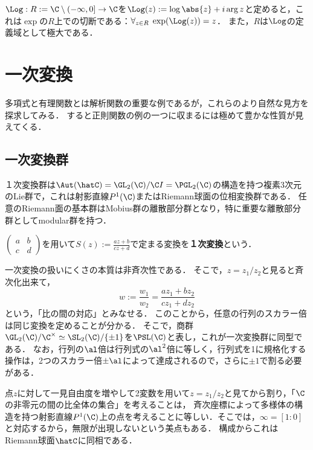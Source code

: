 \documentclass[uplatex, dvipdfmx]{jsreport}
\begin{document}
\begin{theorem}
    $\Log:R:=\C\setminus(-\infty,0]\to\C$を$\Log(z):=\log\abs{z}+i\arg z$と定めると，これは$\exp$の$R$上での切断である：$\forall_{z\in R}\;\exp(\Log(z))=z$．
    また，$R$は$\Log$の定義域として極大である．
\end{theorem}

\section{一次変換}

\begin{tcolorbox}[colframe=ForestGreen, colback=ForestGreen!10!white,breakable,colbacktitle=ForestGreen!40!white,coltitle=black,fonttitle=\bfseries\sffamily,
title=]
    多項式と有理関数とは解析関数の重要な例であるが，これらのより自然な見方を探求してみる．
    すると正則関数の例の一つに収まるには極めて豊かな性質が見えてくる．
\end{tcolorbox}

\subsection{一次変換群}

\begin{tcolorbox}[colframe=ForestGreen, colback=ForestGreen!10!white,breakable,colbacktitle=ForestGreen!40!white,coltitle=black,fonttitle=\bfseries\sffamily,
title=]
    １次変換群は$\Aut(\hatC)=\GL_2(\C)/\C I=\PGL_2(\C)$の構造を持つ複素3次元のLie群で，これは射影直線$P^1(\C)$またはRiemann球面の位相変換群である．
    任意のRiemann面の基本群はMobius群の離散部分群となり，特に重要な離散部分群としてmodular群を持つ．
\end{tcolorbox}

\begin{definition}
    $\begin{pmatrix}
        a&b\\c&d
    \end{pmatrix}$を用いて$S(z):=\frac{az+b}{cz+d}$で定まる変換を\textbf{１次変換}という．
\end{definition}
\begin{discussion}
    一次変換の扱いにくさの本質は非斉次性である．
    そこで，$z=z_1/z_2$と見ると斉次化出来て，
    \[w:=\frac{w_1}{w_2}=\frac{az_1+bz_2}{cz_1+dz_2}\]
    という，「比の間の対応」とみなせる．
    このことから，任意の行列のスカラー倍は同じ変換を定めることが分かる．
    そこで，商群$\GL_2(\C)/\C^\times\simeq\SL_2(\C)/\{\pm1\}$を$\PSL(\C)$と表し，これが一次変換群に同型である．
    なお，行列の$\al$倍は行列式の$\al^2$倍に等しく，行列式を1に規格化する操作は，2つのスカラー倍$\pm\al$によって達成されるので，さらに$\pm1$で割る必要がある．

    点$z$に対して一見自由度を増やして2変数を用いて$z=z_1/z_2$と見てから割り，「$\C$の非零元の間の比全体の集合」を考えることは，
    斉次座標によって多様体の構造を持つ射影直線$P^1(\C)$上の点を考えることに等しい．そこでは，$\infty=[1:0]$と対応するから，無限が出現しないという美点もある．
    構成からこれはRiemann球面$\hatC$に同相である．
\end{discussion}
\end{document}
